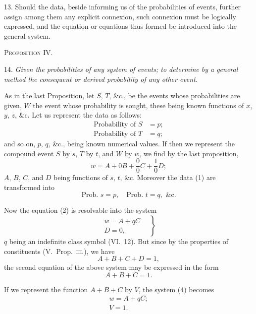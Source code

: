 \documentclass[oneside]{book}
\begin{document}
13. Should the data, beside informing us of the probabilities
of events, further assign among them any explicit connexion, such
connexion must be logically expressed, and the equation or equations
thus formed be introduced into the general system.

\begin{center}\textsc{Proposition IV.}\end{center}

14. \emph{Given the probabilities of any system of events; to determine
by a general method the consequent or derived probability of
any other event.}

As in the last Proposition, let $S$, $T$, \&c., be the events whose
probabilities are given, $W$ the event whose probability is sought,
these being known functions of $x$, $y$, $z$, \&c. Let us represent the
data as follows:
\[
\begin{aligned}
\text{Probability of }S &= p;\\
\text{Probability of }T &= q;
\end{aligned}\tag{1}
\]
and so on, $p$, $q$, \&c., being known numerical values. If then
we represent the compound event $S$ by $s$, $T$ by $t$, and $W$ by $w$,
we find by the last proposition,
\[
w = A + 0B +\frac{0}{0} C + \frac{1}{0} D; \tag{2}
\]
$A$, $B$, $C$, and $D$ being functions of $s$, $t$, \&c. Moreover the data
(1) are transformed into
\[
\text{Prob. }s =p,\quad \text{Prob. }t = q, \text{ \&c.} \tag{3}
\]

Now the equation (2) is resolvable into the system
\[
\left.
\begin{gathered}
w = A + qC\\
D=0,
\end{gathered}\quad\right\}\tag{4}
\]
$q$ being an indefinite class symbol (VI.~12). But since by the
properties of constituents (V.~Prop.~\textsc{iii.}), we have
\[
A + B + C + D= 1,
\]
the second equation of the above system may be expressed in the
form
\[
A + B+ C = 1.
\]

If we represent the function $A + B + C$ by $V$, the system (4)
becomes
\begin{gather}
  w = A + qC;   \tag{5}   \\
  V = 1.        \tag{6}
\end{gather}
\end{document}
